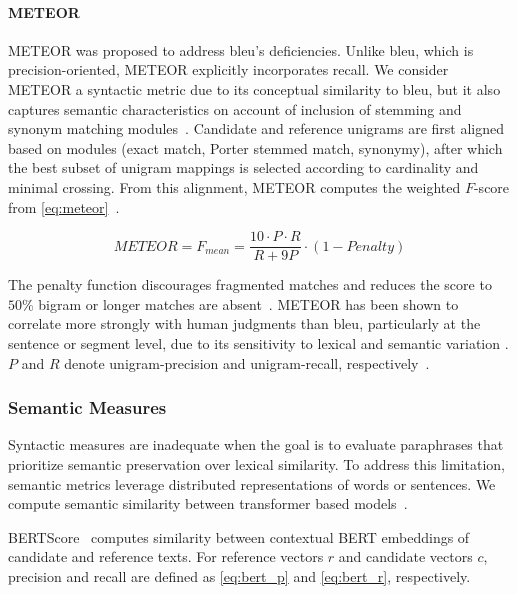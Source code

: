 \paragraph{METEOR}
METEOR was proposed to address \ac{bleu}'s deficiencies. 
Unlike \ac{bleu}, which is precision-oriented, METEOR explicitly incorporates recall.
We consider METEOR a syntactic metric due to its conceptual similarity to \ac{bleu}, but it also captures semantic characteristics on account of inclusion of stemming and synonym matching modules~\citep{kurt_pehlivanoglu_comparative_2024}. 
Candidate and reference unigrams are first aligned based on modules (exact match, Porter stemmed match, synonymy), after which the best subset of unigram mappings is selected according to cardinality and minimal crossing. 
From this alignment, METEOR computes the weighted $F$-score from \autoref{eq:meteor}~\citep{banerjee_METEOR_2005}.

\begin{equation}
    METEOR = F_{mean} = \frac{10 \cdot P \cdot R}{R + 9P} \cdot (1 - Penalty)
\label{eq:meteor}
\end{equation}

The penalty function discourages fragmented matches and reduces the score to $50\%$ bigram or longer matches are absent~\citep{banerjee_METEOR_2005}. 
METEOR has been shown to correlate more strongly with human judgments than \ac{bleu}, particularly at the sentence or segment level, due to its sensitivity to lexical and semantic variation \citep{zhou_paraphrase_2021,kurt_pehlivanoglu_comparative_2024}.
$P$ and $R$ denote unigram-precision and unigram-recall, respectively~\citep{kurt_pehlivanoglu_comparative_2024,banerjee_METEOR_2005}.


\subsubsection{Semantic Measures}
Syntactic measures are inadequate when the goal is to evaluate paraphrases that prioritize semantic preservation over lexical similarity. 
To address this limitation, semantic metrics leverage distributed representations of words or sentences.
We compute semantic similarity between transformer based models~\citep{gohsen_captions_2023}.

BERTScore~\citep{hanna_fine_grained_2021} computes similarity between contextual BERT embeddings of candidate and reference texts. 
For reference vectors $r$ and candidate vectors $c$, precision and recall are defined as \autoref{eq:bert_p} and \autoref{eq:bert_r}, respectively.

